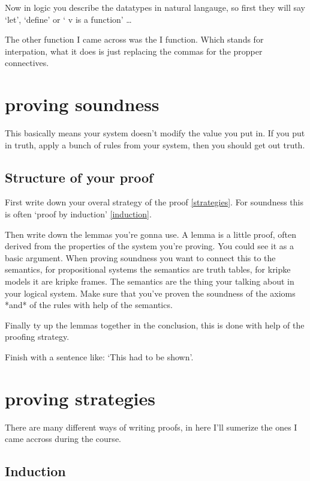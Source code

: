 \documentclass{article}
\begin{document}
Now in logic you describe the datatypes in natural langauge, so first they will
say `let', `define' or ` v is a function' \ldots

The other function I came across was the I function. Which stands for 
interpation, what it does is just replacing the commas for the propper
connectives.

\section{proving soundness}
This basically means your system doesn't modify the value you put in.
If you put in truth, apply a bunch of rules from your system, then you should
get out truth.

\subsection{Structure of your proof}
First write down your overal strategy of the proof \autoref{strategies}. For
soundness this is often `proof by induction' \autoref{induction}.

Then write down the lemmas you're gonna use. A lemma is a little proof, often
derived from the properties of the system you're proving. You could see it
as a basic argument. When proving soundness you want to connect this to the
semantics, for propositional systems the semantics are truth tables, for kripke
models it are kripke frames. The semantics are the thing your talking about
in your logical system.
Make sure that you've proven the soundness of the axioms *and* of the rules
with help of the semantics.

Finally ty up the lemmas together in the conclusion, this is done with help
of the proofing strategy.

Finish with a sentence like: `This had to be shown'.

\section{proving strategies}
\label{strategies}
There are many different ways of writing proofs, in here I'll sumerize the ones
I came accross during the course.

\subsection{Induction}
\label{induction}
\end{document}
